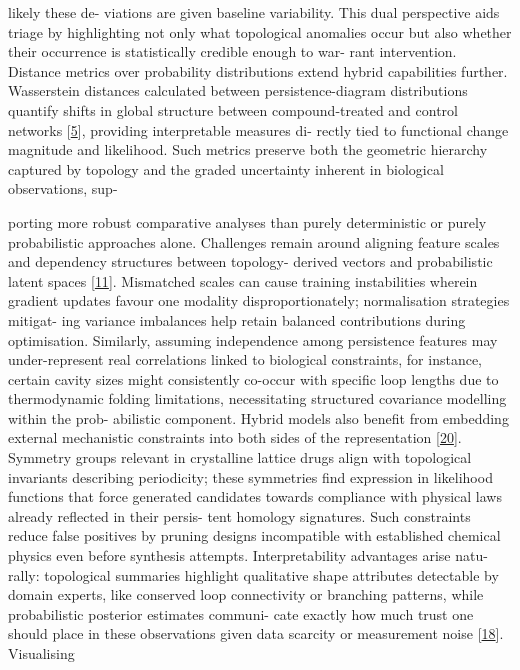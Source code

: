\documentclass[
]{article}
\begin{document}
likely these de- viations are given baseline variability. This dual
perspective aids triage by highlighting not only what topological
anomalies occur but also whether their occurrence is statistically
credible enough to war- rant intervention. Distance metrics over
probability distributions extend hybrid capabilities further.
Wasserstein distances calculated between persistence-diagram
distributions quantify shifts in global structure between
compound-treated and control networks {[}\hyperref[_bookmark45]{5}{]},
providing interpretable measures di- rectly tied to functional change
magnitude and likelihood. Such metrics preserve both the geometric
hierarchy captured by topology and the graded uncertainty inherent in
biological observations, sup-

porting more robust comparative analyses than purely deterministic or
purely probabilistic approaches alone. Challenges remain around aligning
feature scales and dependency structures between topology- derived
vectors and probabilistic latent spaces
{[}\hyperref[_bookmark51]{11}{]}. Mismatched scales can cause training
instabilities wherein gradient updates favour one modality
disproportionately; normalisation strategies mitigat- ing variance
imbalances help retain balanced contributions during optimisation.
Similarly, assuming independence among persistence features may
under-represent real correlations linked to biological constraints, for
instance, certain cavity sizes might consistently co-occur with specific
loop lengths due to thermodynamic folding limitations, necessitating
structured covariance modelling within the prob- abilistic component.
Hybrid models also benefit from embedding external mechanistic
constraints into both sides of the representation
{[}\hyperref[_bookmark60]{20}{]}. Symmetry groups relevant in
crystalline lattice drugs align with topological invariants describing
periodicity; these symmetries find expression in likelihood functions
that force generated candidates towards compliance with physical laws
already reflected in their persis- tent homology signatures. Such
constraints reduce false positives by pruning designs incompatible with
established chemical physics even before synthesis attempts.
Interpretability advantages arise natu- rally: topological summaries
highlight qualitative shape attributes detectable by domain experts,
like conserved loop connectivity or branching patterns, while
probabilistic posterior estimates communi- cate exactly how much trust
one should place in these observations given data scarcity or
measurement noise {[}\hyperref[_bookmark58]{18}{]}. Visualising
\end{document}
